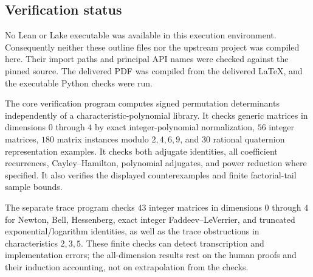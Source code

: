\subsection{Verification status}

No Lean or Lake executable was available in this execution environment.
Consequently neither these outline files nor the upstream project was
compiled here. Their import paths and principal API names were checked
against the pinned source. The delivered PDF was compiled from the
delivered LaTeX, and the executable Python checks were run.

The core verification program computes signed permutation determinants
independently of a characteristic-polynomial library. It checks generic
matrices in dimensions $0$ through $4$ by exact integer-polynomial
normalization, $56$ integer matrices, $180$ matrix instances modulo
$2,4,6,9$, and $30$ rational quaternion representation examples.
It checks both adjugate identities, all coefficient recurrences,
Cayley--Hamilton, polynomial adjugates, and power reduction where
specified. It also verifies the displayed counterexamples and finite
factorial-tail sample bounds.

The separate trace program checks $43$ integer matrices in dimensions
$0$ through $4$ for Newton, Bell, Hessenberg, exact integer
Faddeev--LeVerrier, and truncated exponential/logarithm identities,
as well as the trace obstructions in characteristics $2,3,5$.
These finite checks can detect transcription and implementation errors;
the all-dimension results rest on the human proofs and their induction
accounting, not on extrapolation from the checks.

